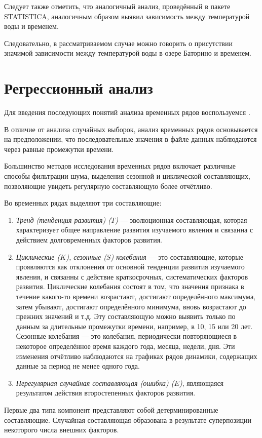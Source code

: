 Следует также отметить, что аналогичный анализ, проведённый в пакете STATISTICA, аналогичным образом выявил зависимость между температурой воды и временем.

Следовательно, в рассматриваемом случае можно говорить о присутствии значимой зависимости между температурой воды в озере Баторино и временем. 


\section{Регрессионный анализ} %
\label{sec:regr_analysis}

Для введения последующих понятий анализа временных рядов воспользуемся \cite{Eddows1997}.

В отличие от анализа случайных выборок, анализ временных рядов основывается на предположении, что последовательные значения в файле данных наблюдаются через равные промежутки времени.

Большинство методов исследования временных рядов включает различные способы фильтрации шума, выделения сезонной и циклической составляющих, позволяющие увидеть регулярную составляющую более отчётливо.

Во временных рядах выделяют три составляющие:
\begin{enumerate}
	\item \textit{Тренд (тенденция развития) ($T$)} --- эволюционная составляющая, которая характеризует общее направление развития изучаемого явления и связанна с действием долговременных факторов развития. 
	\item \textit{Циклические ($K$), сезонные ($S$) колебания} --- это составляющие, которые проявляются как отклонения от основной тенденции развития изучаемого явления, и связанны с действие краткосрочных, систематических факторов развития. Циклические колебания состоят в том, что значения признака в течение какого-то времени возрастают, достигают определённого максимума, затем убывают, достигают определённого минимума, вновь возрастают до прежних значений и т.д. Эту составляющую можно выявить только по данным за длительные промежутки времени, например, в 10, 15 или 20 лет. Сезонные колебания --- это колебания, периодически повторяющиеся в некоторое определённое время каждого года, месяца, недели, дня. Эти изменения отчётливо наблюдаются на графиках рядов динамики, содержащих данные за период не менее одного года.
	\item \textit{Нерегулярная случайная составляющая (ошибка) ($E$)}, являющаяся результатом действия второстепенных факторов развития.
\end{enumerate}
Первые два типа компонент представляют собой детерминированные составляющие. Случайная составляющая образована в результате суперпозиции некоторого числа внешних факторов.

